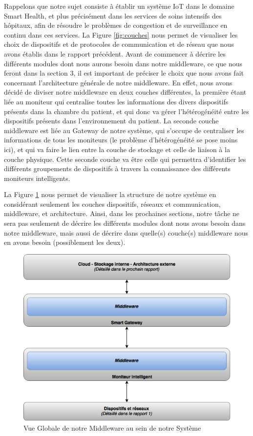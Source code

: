 Rappelons que notre sujet consiste à établir un système IoT dans le domaine Smart Health, et plus précisément dans les services de
soins intensifs des hôpitaux, afin de résoudre le problèmes de congestion et de surveillance en continu dans ces services. La Figure
\ref{fig:couches} nous permet de visualiser les choix de dispositifs et de protocoles de communication et de réseau que nous avons établis
dans le rapport précédent. Avant de commencer à décrire les différents modules dont nous aurons besoin dans notre middleware, ce que nous feront dans la section 3, il est important de préciser le choix que nous avons fait concernant l’architecture générale de notre middleware. En effet, nous avons décidé de diviser notre middleware en deux couches différentes, la première étant liée au moniteur qui centralise toutes les informations des divers dispositifs présents dans la chambre du patient, et qui donc va gérer l’hétérogénéité entre les dispositifs présents dans l’environnement du patient. La seconde couche middleware est liée au Gateway de notre système, qui s’occupe de centraliser les informations de tous les moniteurs (le problème d’hétérogénéité se pose moins ici), et qui va faire le lien entre la couche de stockage et celle de liaison à la couche physique. Cette seconde couche va être celle qui permettra d’identifier les différents groupements de dispositifs à travers la connaissance des différents moniteurs intelligents.

La Figure \ref{fig:vueglobale} nous permet de visualiser la structure de notre système en considérant seulement les couches dispositifs, réseaux et communication, middleware, et architecture. Ainsi, dans les prochaines sections, notre tâche ne sera pas seulement de décrire les différents modules dont nous avons besoin dans notre middleware, mais aussi de décrire dans quelle(s) couche(s) middleware nous en avons besoin (possiblement les deux).

\begin{figure}[h!]
	\hspace*{-2.5cm}
	\centering
	\includegraphics[width=1.4\textwidth]{Figure2.png}
	\caption{Vue Globale de notre Middleware au sein de notre Système}
	\label{fig:vueglobale}
\end{figure}
